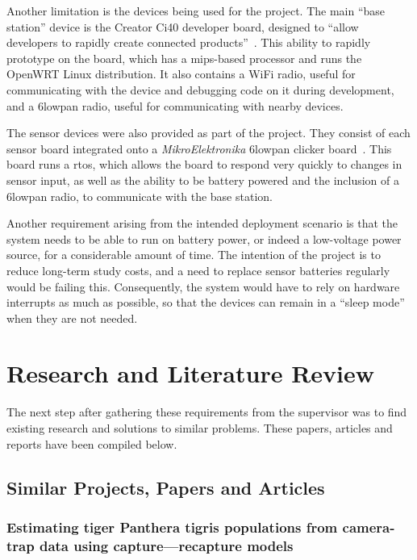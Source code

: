 Another limitation is the devices being used for the project. The main ``base
station'' device is the Creator Ci40 developer board, designed to ``allow
developers to rapidly create connected products''~\cite{creatorci40}. This
ability to rapidly prototype on the board, which has a \acrshort{mips}-based
processor and runs the OpenWRT Linux distribution. It also contains a WiFi
radio, useful for communicating with the device and debugging code on it
during development, and a \gls{6lowpan} radio, useful for communicating with
nearby devices.

The sensor devices were also provided as part of the project. They consist of
each sensor board integrated onto a \textit{MikroElektronika} \gls{6lowpan}
clicker board~\cite{mikroeclick}. This board runs a \acrfull{rtos}, which
allows the board to respond very quickly to changes in sensor input, as well
as the ability to be battery powered and the inclusion of a \gls{6lowpan}
radio, to communicate with the base station.

Another requirement arising from the intended deployment scenario is that the
system needs to be able to run on battery power, or indeed a low-voltage
power source, for a considerable amount of time. The intention of the project
is to reduce long-term study costs, and a need to replace sensor batteries
regularly would be failing this. Consequently, the system would have to rely
on hardware interrupts as much as possible, so that the devices can remain in
a ``sleep mode'' when they are not needed.

\section{Research and Literature Review}

The next step after gathering these requirements from the supervisor was to
find existing research and solutions to similar problems. These papers,
articles and reports have been compiled below.

\subsection{Similar Projects, Papers and Articles}

\subsubsection{Estimating tiger Panthera tigris populations from camera-trap
data using capture—recapture models}

